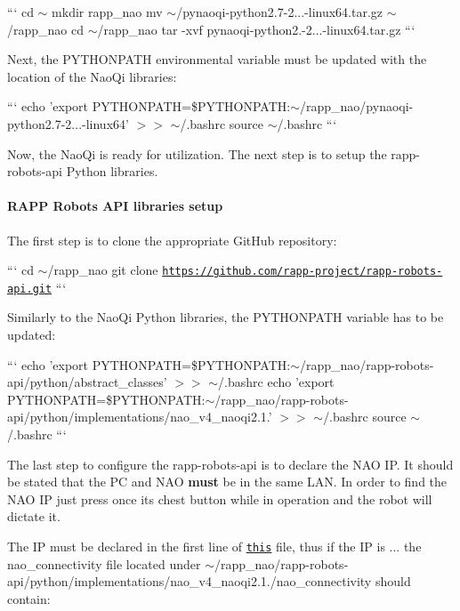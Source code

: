 ``` cd $\sim$ mkdir rapp\-\_\-nao mv $\sim$/pynaoqi-\/python2.7-\/2...-\/linux64.\-tar.\-gz $\sim$/rapp\-\_\-nao cd $\sim$/rapp\-\_\-nao tar -\/xvf pynaoqi-\/python2.-\/2...-\/linux64.\-tar.\-gz ```

Next, the P\-Y\-T\-H\-O\-N\-P\-A\-T\-H environmental variable must be updated with the location of the Nao\-Qi libraries\-:

``` echo 'export P\-Y\-T\-H\-O\-N\-P\-A\-T\-H=\$\-P\-Y\-T\-H\-O\-N\-P\-A\-T\-H\-:$\sim$/rapp\-\_\-nao/pynaoqi-\/python2.7-\/2...-\/linux64' $>$$>$ $\sim$/.bashrc source $\sim$/.bashrc ```

Now, the Nao\-Qi is ready for utilization. The next step is to setup the {\ttfamily rapp-\/robots-\/api} Python libraries.

\paragraph*{R\-A\-P\-P Robots A\-P\-I libraries setup}

The first step is to clone the appropriate Git\-Hub repository\-:

``` cd $\sim$/rapp\-\_\-nao git clone \href{https://github.com/rapp-project/rapp-robots-api.git}{\tt https\-://github.\-com/rapp-\/project/rapp-\/robots-\/api.\-git} ```

Similarly to the Nao\-Qi Python libraries, the {\ttfamily P\-Y\-T\-H\-O\-N\-P\-A\-T\-H} variable has to be updated\-:

``` echo 'export P\-Y\-T\-H\-O\-N\-P\-A\-T\-H=\$\-P\-Y\-T\-H\-O\-N\-P\-A\-T\-H\-:$\sim$/rapp\-\_\-nao/rapp-\/robots-\/api/python/abstract\-\_\-classes' $>$$>$ $\sim$/.bashrc echo 'export P\-Y\-T\-H\-O\-N\-P\-A\-T\-H=\$\-P\-Y\-T\-H\-O\-N\-P\-A\-T\-H\-:$\sim$/rapp\-\_\-nao/rapp-\/robots-\/api/python/implementations/nao\-\_\-v4\-\_\-naoqi2.1.' $>$$>$ $\sim$/.bashrc source $\sim$/.bashrc ```

The last step to configure the {\ttfamily rapp-\/robots-\/api} is to declare the N\-A\-O I\-P. It should be stated that the P\-C and N\-A\-O {\bfseries must} be in the same L\-A\-N. In order to find the N\-A\-O I\-P just press once its chest button while in operation and the robot will dictate it.

The I\-P must be declared in the first line of \href{https://github.com/rapp-project/rapp-robots-api/blob/master/python/implementations/nao_v4_naoqi2.1.4/nao_connectivity}{\tt this} file, thus if the I\-P is {...} the {\ttfamily nao\-\_\-connectivity} file located under {\ttfamily $\sim$/rapp\-\_\-nao/rapp-\/robots-\/api/python/implementations/nao\-\_\-v4\-\_\-naoqi2.1./nao\-\_\-connectivity} should contain\-:

